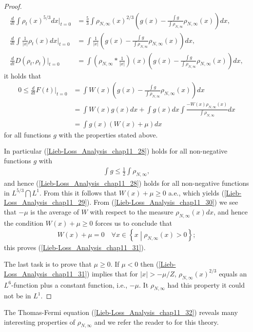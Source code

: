 \documentclass[openany, a4paper, oneside]{jsbook}
\theoremstyle{break}
\theoremstyle{breakdefn}
\newcommand{\abs}[1]{\left|#1\right|}
\newcommand{\rbk}[1]{\left (#1\right)}
\newcommand{\relmiddle}[1]{\mathrel{}\middle#1\mathrel{}}
\newcommand{\set}[2]{\left\{#1 \relmiddle| #2\right\}}
\newcommand{\rhoNinfty}{\rho_{N, \infty}}
\begin{document}
\begin{proof}
\begin{align}
 \frac{d}{dt} \int \rho_t (x)^{5/3} dx \Big |_{t = 0}
 &=
 \frac{5}{3} \int \rhoNinfty (x)^{2/3} \rbk{g (x) - \frac{\int g}{\int \rhoNinfty} \rhoNinfty (x)} dx, \\
 \frac{d}{dt} \int \frac{1}{\abs{x}} \rho_t (x) dx \Big |_{t = 0}
 &=
 \int \frac{1}{\abs{x}} \rbk{g (x) - \frac{\int g}{\int \rhoNinfty} \rhoNinfty (x)} dx, \\
 \frac{d}{dt} D \rbk{\rho_t, \rho_t} \Big |_{t = 0}
 &=
 \int \rbk{\rhoNinfty * \frac{1}{\abs{x}}} (x) \rbk{g (x) - \frac{\int g}{\int \rhoNinfty} \rhoNinfty (x)} dx,
\end{align}
it holds that
\begin{align}
 0 \leq
 \frac{d}{dt} F (t) \Big |_{t = 0}
 &=
 \int W (x) \rbk{g (x) - \frac{\int g}{\int \rhoNinfty} \rhoNinfty (x)} dx \\
 &=
 \int W (x) g (x) dx + \int g (x) dx \int \frac{- W (x) \rhoNinfty (x)}{\int \rhoNinfty} dx \\
 &=
 \int g (x) \rbk{W (x) + \mu} dx \label{Lieb-Loss_Analysis_chap11_28}
\end{align}
for all functions $g$ with the properties stated above.

In particular (\ref{Lieb-Loss_Analysis_chap11_28}) holds for all non-negative functions $g$ with
\begin{align}
 \int g \leq \frac{1}{2} \int \rhoNinfty,
\end{align}
and hence (\ref{Lieb-Loss_Analysis_chap11_28}) holds for all non-negative functions in $L^{5/3} \bigcap L^{1}$.
From this it follows that $W (x) + \mu \geq 0$ a.e., which yields (\ref{Lieb-Loss_Analysis_chap11_29}).
From (\ref{Lieb-Loss_Analysis_chap11_30}) we see that $- \mu$ is the average of $W$ with respect to the measure $\rhoNinfty (x) dx$,
and hence the condition $W (x) + \mu \geq 0$ forces us to conclude that
\begin{align}
 W (x) + \mu = 0 \quad \forall x \in \set{x}{\rhoNinfty (x) > 0};
\end{align}
this proves (\ref{Lieb-Loss_Analysis_chap11_31}).

The last task is to prove that $\mu \geq 0$.
If $\mu < 0$ then (\ref{Lieb-Loss_Analysis_chap11_31}) implies that for $\abs{x} > - \mu / Z$, $\rhoNinfty (x)^{2/3}$ equals
an $L^6$-function plus a constant function, i.e., $- \mu$.
It $\rhoNinfty$ had this property it could not be in $L^1$.
\end{proof}

The Thomas-Fermi equation (\ref{Lieb-Loss_Analysis_chap11_32}) reveals many interesting properties of $\rhoNinfty$
and we refer the reader to \cite{LiebSimon1} for this theory.
\end{document}
